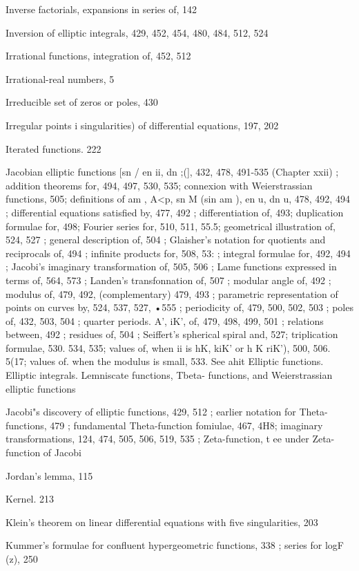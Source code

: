 Inverse factorials, expansions in series of, 142

Inversion of elliptic integrals, 429, 452, 454, 480, 484, 512, 524

Irrational functions, integration of, 452, 512

Irrational-real numbers, 5


%
%

Irreducible set of zeros or poles, 430

Irregular points i singularities) of differential equations, 197, 202

Iterated functions. 222

Jacobian elliptic functions [sn /  en ii, dn ;(], 432, 478, 491-535 (Chapter xxii) ; addition theorems
for, 494, 497, 530, 535; connexion with Weierstrassian functions, 505; definitions of am  ,
A<p, sn M (sin am  ), en u, dn u, 478, 492, 494 ; differential equations satisfied by, 477, 492 ;
differentiation of, 493; duplication formulae for, 498; Fourier series for, 510, 511, 55.5;
geometrical illustration of, 524, 527 ; general description of, 504 ; Glaisher's notation for
quotients and reciprocals of, 494 ; infinite products for, 508, 53:  ; integral formulae for, 492,
494 ; Jacobi's imaginary transformation of, 505, 506 ; Lame functions expressed in terms of,
564, 573 ; Landen's transfonnation of, 507 ; modular angle of, 492 ; modulus of, 479, 492,
(complementary) 479, 493 ; parametric representation of points on curves by, 524, 537, 527,
•555 ; periodicity of, 479, 500, 502, 503 ; poles of, 432, 503, 504 ; quarter periods. A', iK', of,
479, 498, 499, 501 ; relations between, 492 ; residues of, 504 ; Seiffert's spherical spiral and,
527; triplication formulae, 530. 534, 535; values of, when ii is hK, kiK' or h  K riK'), 500,
506. 5(17; values of. when the modulus is small, 533. See ahit Elliptic functions. Elliptic
integrals. Lemniscate functions, Tbeta- functions, and Weierstrassian elliptic functions

Jacobi"s discovery of elliptic functions, 429, 512 ; earlier notation for Theta-functions, 479 ;
fundamental Theta-function fomiulae, 467, 4H8; imaginary transformations, 124, 474, 505,
506, 519, 535 ; Zeta-function, t ee under Zeta-function of Jacobi

Jordan's lemma, 115

Kernel. 213

Klein's theorem on linear differential equations with five singularities, 203

Kummer's formulae for confluent hypergeometric functions, 338 ; series for logF (z), 250

